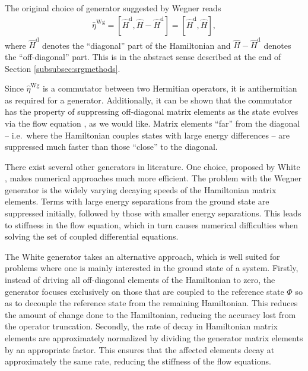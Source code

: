 \documentclass[aip, jcp, 12pt]{revtex4-1}
\begin{document}
The original choice of generator suggested by Wegner \cite{Wegner200177} reads
\begin{align*}
  \hat{\eta}^{\text{Wg}}
  = [\hat{H}^{\text{d}}, \hat{H} - \hat{H}^{\text{d}}]
  = [\hat{H}^{\text{d}}, \hat{H}],
\end{align*}
where $\hat{H}^{\text{d}}$ denotes the ``diagonal'' part of the Hamiltonian and $\hat{H} - \hat{H}^{\text{d}}$ denotes the ``off-diagonal'' part.  This is in the abstract sense described at the end of Section \ref{subsubsec:srgmethods}.

Since $\hat{\eta}^{\text{Wg}}$ is a commutator between two Hermitian operators, it is antihermitian as required for a generator.  Additionally, it can be shown that the commutator has the property of suppressing off-diagonal matrix elements as the state evolves via the flow equation \cite{kehrein2006flow}, as we would like.  Matrix elements ``far'' from the diagonal -- i.e.\ where the Hamiltonian couples states with large energy differences -- are suppressed much faster than those ``close'' to the diagonal.

There exist several other generators in literature.  One choice, proposed by White \cite{White:cond-mat0201346}, makes numerical approaches much more efficient.  The problem with the Wegner generator is the widely varying decaying speeds of the Hamiltonian matrix elements.  Terms with large energy separations from the ground state are suppressed initially, followed by those with smaller energy separations.  This leads to stiffness in the flow equation, which in turn causes numerical difficulties when solving the set of coupled differential equations.

The White generator takes an alternative approach, which is well suited for problems where one is mainly interested in the ground state of a system.  Firstly, instead of driving all off-diagonal elements of the Hamiltonian to zero, the generator focuses exclusively on those that are coupled to the reference state $\Phi$ so as to decouple the reference state from the remaining Hamiltonian.  This reduces the amount of change done to the Hamiltonian, reducing the accuracy lost from the operator truncation.  Secondly, the rate of decay in Hamiltonian matrix elements are approximately normalized by dividing the generator matrix elements by an appropriate factor.  This ensures that the affected elements decay at approximately the same rate, reducing the stiffness of the flow equations.
\end{document}
